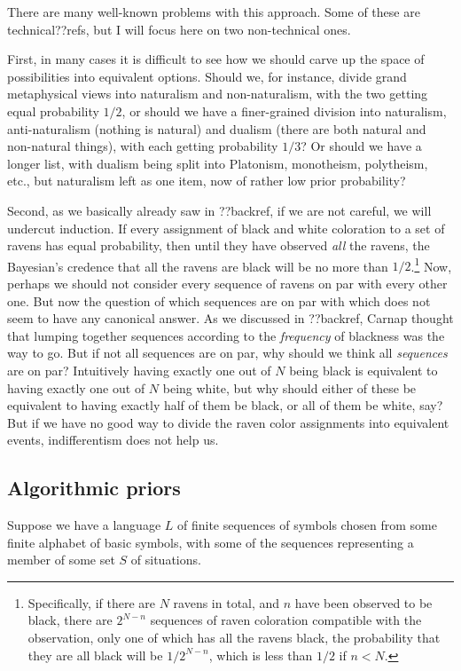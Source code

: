 There are many well-known problems with this approach. Some of these are technical??refs, but I will
focus here on two non-technical ones.

First, in many cases it is
difficult to see how we should carve up the space of possibilities into equivalent options. Should we,
for instance, divide grand metaphysical views  into naturalism and non-naturalism, with the two getting
equal probability $1/2$, or should we have a finer-grained division into naturalism, anti-naturalism
(nothing is natural) and dualism (there are both natural and non-natural things), with each getting 
probability $1/3$? Or should we have a longer list, with dualism being split into Platonism, monotheism,
polytheism, etc., but naturalism left as one item, now of rather low prior probability? 

Second, as we basically already saw in ??backref, if we are not careful, we will undercut induction.
If every assignment of black and white coloration to a set of ravens has equal probability, then until
they have observed \textit{all} the ravens, the Bayesian's credence that all the ravens are black will
be no more than $1/2$.\footnote{Specifically, if there are $N$ ravens in total, and $n$ have been observed 
to be black, there are $2^{N-n}$ sequences of raven coloration compatible with the observation, only
one of which has all the ravens black, the probability that they are all black will be $1/2^{N-n}$, which
is less than $1/2$ if $n<N$.} Now, perhaps we should not consider every sequence of ravens on par with 
every other one. But now the question of which sequences are on par with which does not seem to have any
canonical answer. As we discussed in ??backref, Carnap thought that lumping together sequences 
according to the \textit{frequency} of blackness was the way to go. But if not all sequences are on par,
why should we think all \textit{sequences} are on par? Intuitively having exactly one out of $N$ being black 
is equivalent to having exactly one out of $N$ being white, but why should either of these be equivalent 
to having exactly half of them be black, or all of them be white, say? But if we have no good way to 
divide the raven color assignments into equivalent events, indifferentism does not help us.

\subsection{Algorithmic priors}
Suppose we have a language $L$ of finite sequences of symbols chosen from some finite alphabet of basic symbols, 
with some of the sequences representing a member of some set $S$ of situations. 

